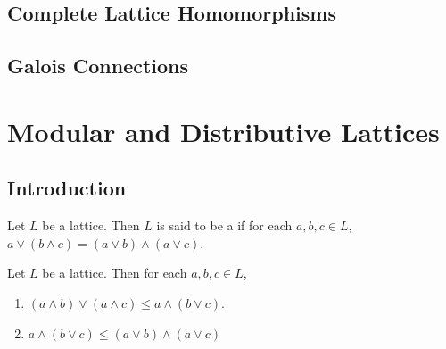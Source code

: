 \documentclass{book}
\begin{document}
	
	
	
	
	\subsection{Complete Lattice Homomorphisms}
	
	
	
	
	
	
	
	
	
	
	
	
	\subsection{Galois Connections}
	
	
	
	
	
	
	
	
	
	
	
	
	
	
	
	
	
	
	
	
	
	
	
	
	
	
	
	
	
	
	
	
	
	
	
	
	
	
	
	
	
	
	
	
	
	
\section{Modular and Distributive Lattices}
	
	\subsection{Introduction}

	\begin{defn}
		Let $L$ be a lattice. Then $L$ is said to be a  if for each $a,b,c \in L$, $a \vee (b \wedge c) = (a \vee b) \wedge (a \vee c)$.
	\end{defn}
	
	\begin{ex}
		Let $L$ be a lattice. Then for each $a,b,c \in L$,
		\begin{enumerate}
			\item $(a \wedge b) \vee (a \wedge c) \leq a \wedge (b \vee c)$.
			\item $a \wedge (b \vee c) \leq (a \vee b) \wedge (a \vee c)$
		\end{enumerate}
	\end{ex}
	
\end{document}
